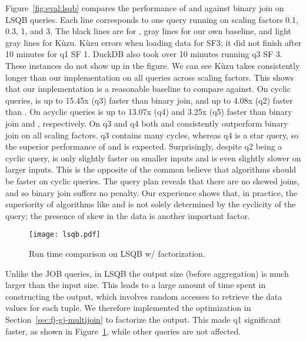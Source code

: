 Figure~\ref{fig:eval:lsqb} compares the performance of \FJ and \GJ against binary join on LSQB queries.
Each line corresponds to one query running on scaling factors 0.1, 0.3, 1, and 3.
The black lines are for \FJ, gray lines for our own \GJ baseline, and light gray lines for K\`uzu.
K\`uzu errors when loading data for SF3;
it did not finish after 10 minutes for q1 SF 1.
DuckDB also took over 10 minutes running q3 SF 3.
These instances do not show up in the figure.
We can see K\`uzu takes consistently longer than our \GJ implementation
on all queries across scaling factors.
This shows that our \GJ implementation is a reasonable baseline to compare against.
On cyclic queries, \FJ is up to 15.45x (q3) faster than binary join,
and up to 4.08x (q2) faster than \GJ.
On acyclic queries \FJ is up to 13.07x (q4) and 3.25x (q5) faster than binary join and \GJ, respectively.
On q3 and q4 both \FJ and \GJ consistently outperform binary join on all scaling factors.
q3 contains many cycles, whereas q4 is a star query, so the superior performance of \FJ and \GJ is expected.
Surprisingly, despite q2 being a cyclic query,
\FJ is only slightly faster on smaller inputs
and is even slightly slower on larger inputs.
This is the opposite of the common believe that \WCOJ algorithms
should be faster on cyclic queries.
The query plan reveals that there are no skewed joins,
and so binary join suffers no penalty.
Our experience shows that, in practice,
the superiority of \WCOJ algorithms like \FJ and \GJ
is not solely determined by the cyclicity of the query;
the presence of skew in the data is another important factor.

\begin{figure}
  \centering
  \texttt{[image: lsqb.pdf]}
  \caption{Run time comparison on LSQB w/ factorization.}
  \label{fig:eval:lsqb-factor}
\end{figure}

Unlike the JOB queries, in LSQB the output size (before aggregation)
is much larger than the input size.
This leads to a large amount of time spent in constructing the output,
which involves random accesses to retrieve the data values for each tuple.
We therefore implemented the optimization in Section~\ref{sec:fj-gj-multijoin}
to factorize the output.
This made q1 significant faster, as shown in Figure~\ref{fig:eval:lsqb-factor},
while other queries are not affected.

